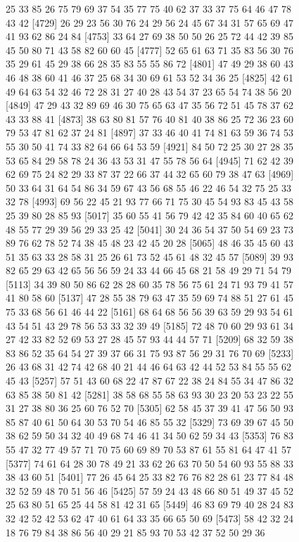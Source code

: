 \documentclass{article}
\begin{document}
\begin{figure}[H]
\begin{Schunk}
\begin{Soutput}
 [4705] 25 33 85 26 75 79 69 37 54 35 77 75 40 62 37 33 37 75 64 46 47 78 43 42
 [4729] 26 29 23 56 30 76 24 29 56 24 45 67 34 31 57 65 69 47 41 93 62 86 24 84
 [4753] 33 64 27 69 38 50 50 26 25 72 44 42 39 85 45 50 80 71 43 58 82 60 60 45
 [4777] 52 65 61 63 71 35 83 56 30 76 35 29 61 45 29 38 66 28 35 83 55 55 86 72
 [4801] 47 49 29 38 60 43 46 48 38 60 41 46 37 25 68 34 30 69 61 53 52 34 36 25
 [4825] 42 61 49 64 63 54 32 46 72 28 31 27 40 28 43 54 37 23 65 54 74 38 56 20
 [4849] 47 29 43 32 89 69 46 30 75 65 63 47 35 56 72 51 45 78 37 62 43 33 88 41
 [4873] 38 63 80 81 57 76 40 81 40 38 86 25 72 36 23 60 79 53 47 81 62 37 24 81
 [4897] 37 33 46 40 41 74 81 63 59 36 74 53 55 30 50 41 74 33 82 64 66 64 53 59
 [4921] 84 50 72 25 30 27 28 35 53 65 84 29 58 78 24 36 43 53 31 47 55 78 56 64
 [4945] 71 62 42 39 62 69 75 24 82 29 33 87 37 22 66 37 44 32 65 60 79 38 47 63
 [4969] 50 33 64 31 64 54 86 34 59 67 43 56 68 55 46 22 46 54 32 75 25 33 32 78
 [4993] 69 56 22 45 21 93 77 66 71 75 30 45 54 93 83 45 43 58 25 39 80 28 85 93
 [5017] 35 60 55 41 56 79 42 42 35 84 60 40 65 62 48 55 77 29 39 56 29 33 25 42
 [5041] 30 24 36 54 37 50 54 69 23 73 89 76 62 78 52 74 38 45 48 23 42 45 20 28
 [5065] 48 46 35 45 60 43 51 35 63 33 28 58 31 25 26 61 73 52 45 61 48 32 45 57
 [5089] 39 93 82 65 29 63 42 65 56 56 59 24 33 44 66 45 68 21 58 49 29 71 54 79
 [5113] 34 39 80 50 86 62 28 28 60 35 78 56 75 61 24 71 93 79 41 57 41 80 58 60
 [5137] 47 28 55 38 79 63 47 35 59 69 74 88 51 27 61 45 75 33 68 56 61 46 44 22
 [5161] 68 64 68 56 56 39 63 59 29 93 54 61 43 54 51 43 29 78 56 53 33 32 39 49
 [5185] 72 48 70 60 29 93 61 34 27 42 33 82 52 69 53 27 28 45 57 93 44 44 57 71
 [5209] 68 32 59 38 83 86 52 35 64 54 27 39 37 66 31 75 93 87 56 29 31 76 70 69
 [5233] 26 43 68 31 42 74 42 68 40 21 44 46 64 63 42 44 52 53 84 55 55 62 45 43
 [5257] 57 51 43 60 68 22 47 87 67 22 38 24 84 55 34 47 86 32 63 85 38 50 81 42
 [5281] 38 58 68 55 58 63 93 30 23 20 53 23 22 55 31 27 38 80 36 25 60 76 52 70
 [5305] 62 58 45 37 39 41 47 56 50 93 85 87 40 61 50 64 30 53 70 54 46 85 55 32
 [5329] 73 69 39 67 45 50 38 62 59 50 34 32 40 49 68 74 46 41 34 50 62 59 34 43
 [5353] 76 83 55 47 32 77 49 57 71 70 75 60 69 89 70 53 87 61 55 81 64 47 41 57
 [5377] 74 61 64 28 30 78 49 21 33 62 26 63 70 50 54 60 93 55 88 33 38 43 60 51
 [5401] 77 26 45 64 25 33 82 76 76 82 28 61 23 77 84 48 32 52 59 48 70 51 56 46
 [5425] 57 59 24 43 48 66 80 51 49 37 45 52 25 63 80 51 65 25 44 58 81 42 31 65
 [5449] 46 83 69 79 40 28 24 83 32 42 52 42 53 62 47 40 61 64 33 35 66 65 50 69
 [5473] 58 42 32 24 18 76 79 84 38 86 56 40 29 21 85 93 70 53 42 37 52 50 29 36

\end{Soutput}
\end{Schunk}
\end{figure}
\end{document}
